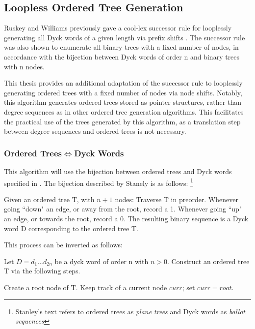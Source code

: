 
\subsection{Loopless Ordered Tree Generation}

Ruskey and Williams previously gave a cool-lex successor rule for looplessly generating all Dyck words  of a given length via prefix shifts \cite{ruskey2008generating}.  The successor rule was also shown to enumerate all binary trees with a fixed number of nodes, in accordance with the bijection between Dyck words of order n and binary trees with n nodes.  

This thesis provides an additional adaptation of the successor rule to looplessly generating ordered trees with a fixed number of nodes via node shifts. %
Notably, this algorithm generates ordered trees stored as pointer structures, rather than degree sequences as in other ordered tree generation algorithms. %
This facilitates the practical %
use of the trees generated by this algorithm, as a translation step between degree sequences and ordered trees is not necessary.
\subsubsection{Ordered Trees$\iff$Dyck Words}
This algorithm will use the bijection between ordered trees and Dyck words specified in \cite{stanley2015catalan}. The bijection described by Stanely is as follows:%
\footnote{ Stanley's text refers to ordered trees as \emph{plane trees} and Dyck words as \emph{ballot sequences}} 

Given an ordered tree T, with $n+1$ nodes: Traverse T in preorder.  Whenever going ``down" an edge, or away from the root, record a 1.  Whenever going ``up" an edge, or towards the root, record a 0.  The resulting binary sequence is a Dyck word D corresponding to the ordered tree T. 

This process can be inverted as follows: 

Let $D=d_1...d_{2n}$ be a dyck word of order n with $n > 0$. Construct an ordered tree T via the following steps. 

Create a root node of T.  Keep track of a current node $curr$; set $curr=root$.

